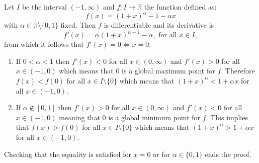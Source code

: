 \documentclass[12pt]{article}
\begin{document}
Let $I$ be the interval $(-1, \infty)$ and 
$f :I \rightarrow \mathbb R$ the function defined as:
\[
   f(x) = (1 + x)^\alpha - 1 - \alpha x
\]
with $\alpha \in \mathbb R \setminus \lbrace 0, 1 \rbrace$ fixed.
Then $f$ is differentiable and its derivative is
\[
   f'(x) = \alpha (1 + x)^{\alpha - 1} - \alpha,
   \mbox{ for all } x \in I,
\]
from which it follows that $f'(x) = 0 \Leftrightarrow x = 0$.
\begin{enumerate}
\item
If $0 < \alpha < 1$ then $f'(x) < 0$ for all $x \in (0, \infty)$
and $f'(x) > 0$ for all $x \in (-1, 0)$ which means that $0$ is a
global maximum point for $f$.
Therefore 
$f(x) < f(0)$ for all $x \in I \setminus \lbrace 0 \rbrace$
which means that
$(1 + x)^\alpha < 1 + \alpha x$ for all $x \in (-1, 0)$.
\item
If $\alpha \notin [0, 1]$ then $f'(x) > 0$ for all $x \in (0, \infty)$
and $f'(x) < 0$ for all $x \in (-1, 0)$ meaning that $0$ is a global
minimum point for $f$.
This implies that 
$f(x) > f(0)$ for all $x \in I \setminus \lbrace 0 \rbrace$
which means that 
$(1 + x)^\alpha > 1 + \alpha x$ for all $x \in (-1, 0)$.
\end{enumerate}

Checking that the equality is satisfied for $x = 0$ or for \( \alpha \in
\lbrace 0, 1 \rbrace \) ends the proof.
\end{document}
